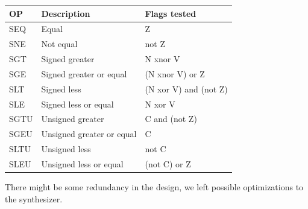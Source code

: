 \documentclass[12pt]{article}
\begin{document}
\begin{center}
	\begin{tabular}{ | l | l | l |}
		\hline
		OP & Description & Flags tested \\ \hline
		SEQ & Equal & Z \\ \hline
		SNE & Not equal &  not Z \\ \hline
		SGT & Signed greater & N xnor V \\ \hline
		SGE & Signed greater or equal & (N  xnor  V) or Z \\ \hline
		SLT & Signed less & (N xor V) and (not Z)\\ \hline
		SLE & Signed less or equal & N xor V \\ \hline
		SGTU & Unsigned greater & C and (not Z) \\ \hline
		SGEU & Unsigned greater or equal & C \\ \hline
		SLTU & Unsigned less & not C \\ \hline
		SLEU & Unsigned less or equal & (not C) or Z  \\ \hline

	\end{tabular}
\end{center}

There might be some redundancy in the design, we left possible optimizations to the synthesizer.
\end{document}
